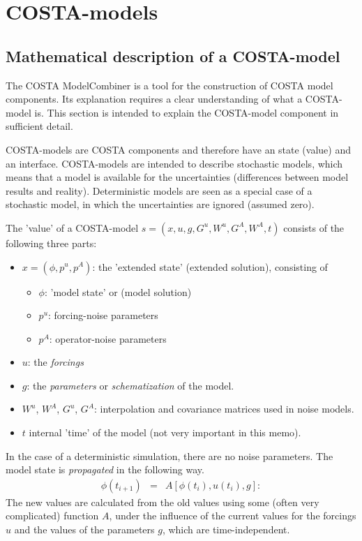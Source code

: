 \documentclass[a4paper,12pt]{article}
\begin{document}
\section{COSTA-models}\label{Sec: models}
\subsection{Mathematical description of a COSTA-model}
\label{Sec: model math}
The COSTA ModelCombiner is a tool for the construction of COSTA model
components. Its explanation requires a clear understanding of what a
COSTA-model is. This section is intended to explain the COSTA-model
component in sufficient detail. 

COSTA-models are COSTA components and therefore have an state (value)
and an interface. COSTA-models are intended to describe stochastic models,
which means that a model is available for the uncertainties 
(differences between model results and reality). Deterministic models 
are seen as a special case of a stochastic model, in which the uncertainties 
are ignored (assumed zero).

The 'value' of a COSTA-model $s=(x,u,g,G^u,W^u,G^A,W^A,t)$
consists of the following three parts:
\begin{itemize}
\item $x=(\phi,p^u,p^A)$: the 'extended state' (extended solution),
consisting of
     \begin{itemize}
        \item $\phi$: 'model state' or (model solution)
        \item $p^u$: forcing-noise parameters
        \item $p^A$: operator-noise parameters
     \end{itemize}
\item $u$: the {\em forcings}
\item $g$: the {\em parameters} or {\em schematization} of the model.
\item $W^u$, $W^A$, $G^u$, $G^A$: interpolation and covariance matrices used 
      in noise models.
\item $t$ internal 'time' of the model (not very important in this memo).
\end{itemize}

In the case of a deterministic simulation, there are no noise parameters. 
The model state is {\em propagated} in the following way.
\begin{eqnarray}\label{Eq:GeneralModel}
\phi\left( t_{i+1} \right) &=& 
 A \left[ \phi \left(t_i\right), u \left( t_i \right), g\right]:
\end{eqnarray}
The new values are calculated from the old values using some (often very
complicated) function $A$, under the influence of
the current values for the forcings $u$ and the values of the parameters
$g$, which are time-independent.
\end{document}
